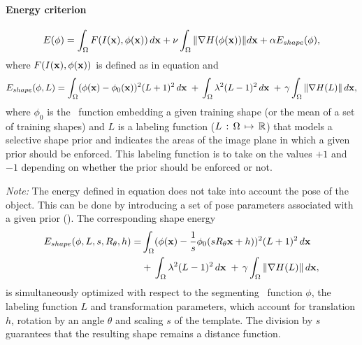 \paragraph{Energy criterion}
\begin{equation}
  \label{eq:NRJ_cremers2003b}
  E(\phi) = \int_\Omega F(I(\mathbf{x}), \phi(\mathbf{x})) \, d\mathbf{x} + \nu \int_\Omega \| \nabla H(\phi(\mathbf{x})) \| d\mathbf{x} + \alpha E_{shape}(\phi),
\end{equation}
where $F(I(\mathbf{x}), \phi(\mathbf{x}))$ is defined as in equation  and
\begin{equation}
  \label{eq:Eshape_cremers2003b}
  E_{shape}(\phi,L) = \int_\Omega (\phi(\mathbf{x}) - \phi_0(\mathbf{x}))^2 (L + 1)^2 \, d\mathbf{x} \; + \, \int_\Omega \lambda^2 (L - 1)^2 \, d\mathbf{x} \; + \, \gamma \int_\Omega \| \nabla H(L) \| \, d\mathbf{x},
\end{equation}
where $\phi_0$ is the \ls~function embedding a given training shape (or the mean of a set of training shapes) and $L$ is a labeling function ($L \, : \, \Omega \, \mapsto \, \mathbb{R}$) that models a selective shape prior  and indicates the areas of the image plane in which a given prior should be enforced. This labeling function is to take on the values $+1$ and $-1$ depending on whether the prior should be enforced or not.

\emph{Note:} The energy defined in equation  does not take into account the pose of the object. This can be done by introducing  a set of pose parameters associated with a given prior (\cite{Chen2002, Rousson2002, Cremers2006}). The corresponding shape energy 
\begin{align}
  \label{eq:Eshape_pose_cremers2003b}
  \nonumber E_{shape}(\phi,L,s,R_\theta,h) = & \int_\Omega (\phi(\mathbf{x}) - \frac{1}{s}\phi_0(s R_\theta\mathbf{x} + h))^2 (L + 1)^2 \, d\mathbf{x} \\
	& + \, \int_\Omega \lambda^2 (L - 1)^2 \, d\mathbf{x} \;  + \, \gamma \int_\Omega \| \nabla H(L) \| \, d\mathbf{x},
\end{align}
is simultaneously optimized with respect to the segmenting \ls~function $\phi$, the labeling function $L$ and transformation parameters, which account for translation $h$, rotation by an angle $\theta$ and scaling $s$ of the template. The division by $s$ guarantees that the resulting shape remains a distance function.



